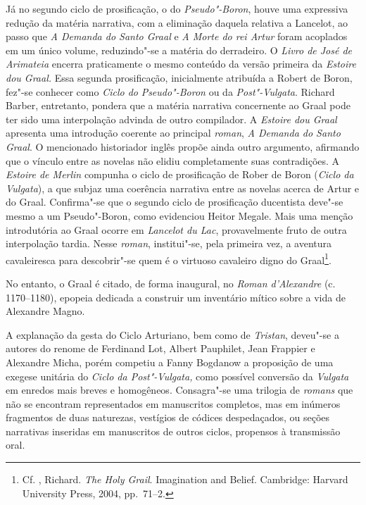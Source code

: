 Já no segundo ciclo de prosificação, o do \textit{Pseudo"-Boron}, houve uma
expressiva redução da matéria narrativa, com a eliminação daquela relativa a
Lancelot, ao passo que \textit{A Demanda do Santo Graal} e \textit{A Morte do
rei Artur} foram acoplados em um único volume, reduzindo"-se a matéria do
derradeiro. O \textit{Livro de José de Arimateia} encerra praticamente o mesmo
conteúdo da versão primeira da \textit{Estoire dou Graal.} Essa segunda
prosificação, inicialmente atribuída a Robert de Boron, fez"-se conhecer como
\textit{Ciclo do }\textit{Pseudo"-Boron} ou da \textit{Post"-Vulgata}. Richard
Barber, entretanto, pondera que a matéria narrativa concernente ao Graal pode
ter sido uma interpolação advinda de outro compilador. A \textit{Estoire dou Graal} apresenta uma
introdução coerente ao principal \textit{roman}, \textit{A Demanda do Santo
Graal}. O mencionado historiador inglês propõe ainda outro argumento, afirmando
que o vínculo entre as novelas não elidiu completamente suas contradições. A
\textit{Estoire de Merlin} compunha o ciclo de prosificação de Rober de Boron
(\textit{Ciclo da Vulgata}), a que subjaz uma coerência narrativa entre as
novelas acerca de Artur e do Graal. Confirma"-se que o segundo ciclo de
prosificação ducentista deve"-se mesmo a um Pseudo"-Boron, como evidenciou Heitor
Megale. Mais uma menção introdutória ao Graal ocorre em
\textit{Lancelot du Lac}, provavelmente fruto de outra interpolação tardia.
Nesse \textit{roman}, institui"-se, pela primeira vez, a aventura cavaleiresca
para descobrir"-se quem é o virtuoso cavaleiro digno do Graal\footnote{ Cf.
, Richard.\textit{ The Holy Grail}. Imagination and Belief. Cambridge:
Harvard University Press, 2004,  pp.~71--2. }. 

No entanto, o Graal é citado, de forma inaugural, no \textit{Roman d'Alexandre}
(c. 1170--1180), epopeia dedicada a construir um inventário mítico sobre a vida de 
Alexandre Magno.

A explanação da gesta do Ciclo Arturiano, bem como de \textit{Tristan}, deveu"-se
a autores do renome de Ferdinand Lot, Albert Pauphilet, Jean Frappier e
Alexandre Micha, porém competiu a Fanny Bogdanow a proposição de uma exegese
unitária do \textit{Ciclo da Post"-Vulgata,} como possível conversão da
\textit{Vulgata} em enredos mais breves e homogêneos. Consagra"-se uma trilogia
de \textit{romans} que não se encontram representados em manuscritos completos, mas em
inúmeros fragmentos de duas naturezas, vestígios de códices despedaçados, ou
seções narrativas inseridas em manuscritos de outros ciclos, propensos à
transmissão oral.


